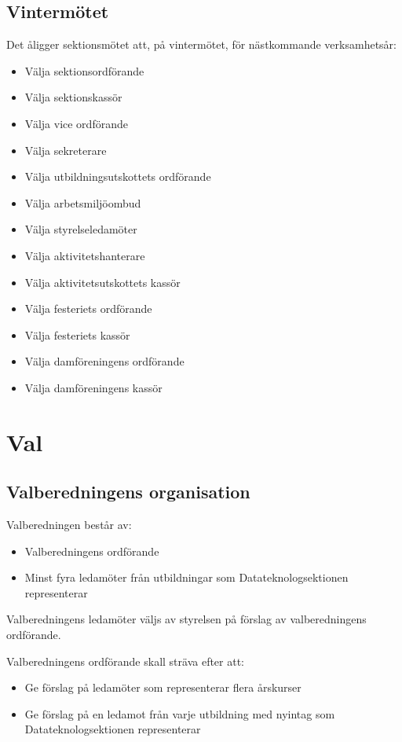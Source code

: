 \documentclass{datateknologsektionen-document}
\begin{document}
\subsection{Vintermötet}
Det åligger sektionsmötet att, på vintermötet, för nästkommande verksamhetsår:
\begin{itemize}
  \item Välja sektionsordförande
  \item Välja sektionskassör
  \item Välja vice ordförande
  \item Välja sekreterare
  \item Välja utbildningsutskottets ordförande
  \item Välja arbetsmiljöombud
  \item Välja styrelseledamöter
  \item Välja aktivitetshanterare
  \item Välja aktivitetsutskottets kassör
  \item Välja festeriets ordförande
  \item Välja festeriets kassör
  \item Välja damföreningens ordförande
  \item Välja damföreningens kassör
\end{itemize}

\section{Val}
\subsection{Valberedningens organisation}
Valberedningen består av:
\begin{itemize}
  \item Valberedningens ordförande
  \item Minst fyra ledamöter från utbildningar som Datateknologsektionen representerar
\end{itemize}

Valberedningens ledamöter väljs av styrelsen på förslag av valberedningens ordförande.

Valberedningens ordförande skall sträva efter att:
\begin{itemize}
  \item Ge förslag på ledamöter som representerar flera årskurser
  \item Ge förslag på en ledamot från varje utbildning med nyintag som Datateknologsektionen representerar
\end{itemize}
\end{document}
